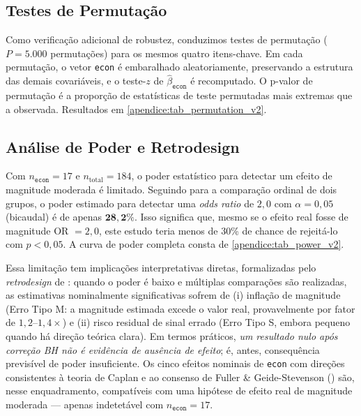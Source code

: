 \subsection{Testes de Permutação}\label{sec:permutation}

Como verificação adicional de robustez, conduzimos testes de permutação ($P = 5.000$ permutações) para os mesmos quatro itens-chave. Em cada permutação, o vetor \texttt{econ} é embaralhado aleatoriamente, preservando a estrutura das demais covariáveis, e o teste-$z$ de $\hat{\beta}_{\texttt{econ}}$ é recomputado. O p-valor de permutação é a proporção de estatísticas de teste permutadas mais extremas que a observada. Resultados em \autoref{apendice:tab_permutation_v2}.

\subsection{Análise de Poder e Retrodesign}\label{sec:poder-e-retrodesign}

Com $n_{\texttt{econ}} = 17$ e $n_{\text{total}} = 184$, o poder estatístico para detectar um efeito de magnitude moderada é limitado. Seguindo  para a comparação ordinal de dois grupos, o poder estimado para detectar uma \textit{odds ratio} de $2{,}0$ com $\alpha = 0{,}05$ (bicaudal) é de apenas $\mathbf{28{,}2\%}$. Isso significa que, mesmo se o efeito real fosse de magnitude OR $= 2{,}0$, este estudo teria menos de 30\% de chance de rejeitá-lo com $p < 0{,}05$. A curva de poder completa consta de \autoref{apendice:tab_power_v2}.

Essa limitação tem implicações interpretativas diretas, formalizadas pelo \textit{retrodesign} de : quando o poder é baixo e múltiplas comparações são realizadas, as estimativas nominalmente significativas sofrem de (i) inflação de magnitude (Erro Tipo M: a magnitude estimada excede o valor real, provavelmente por fator de $1{,}2$--$1{,}4\times$) e (ii) risco residual de sinal errado (Erro Tipo S, embora pequeno quando há direção teórica clara). Em termos práticos, \textit{um resultado nulo após correção BH não é evidência de ausência de efeito}; é, antes, consequência previsível de poder insuficiente. Os cinco efeitos nominais de \texttt{econ} com direções consistentes à teoria de Caplan e ao consenso de Fuller \& Geide-Stevenson (\citeyear{Fuller2014}) são, nesse enquadramento, compatíveis com uma hipótese de efeito real de magnitude moderada — apenas indetetável com $n_{\texttt{econ}} = 17$.

